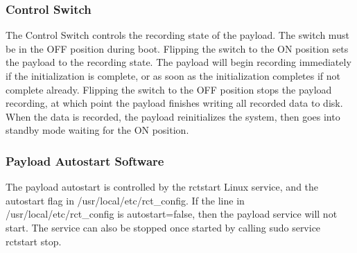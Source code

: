 \documentclass{report}
\begin{document}
						\subsubsection{Control Switch}
							The Control Switch controls the recording state of the payload.  The switch must be in the OFF position during boot.  Flipping the switch to the ON position sets the payload to the recording state.  The payload will begin recording immediately if the initialization is complete, or as soon as the initialization completes if not complete already.  Flipping the switch to the OFF position stops the payload recording, at which point the payload finishes writing all recorded data to disk.  When the data is recorded, the payload reinitializes the system, then goes into standby mode waiting for the ON position.
						\subsubsection{Payload Autostart Software}
							The payload autostart is controlled by the rctstart Linux service, and the autostart flag in /usr/local/etc/rct\_config.  If the line in /usr/local/etc/rct\_config is autostart=false, then the payload service will not start.  The service can also be stopped once started by calling sudo service rctstart stop.
	\appendix
	\printglossaries
\end{document}
